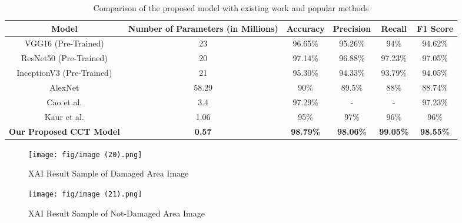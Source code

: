 \documentclass[conference]{IEEEtran}
\begin{document}
\begin{table*}['ht']
\centering
\caption{Comparison of the proposed model with existing work and popular methods}
\label{tab}
\begin{tabular}{|c|c|c|c|c|c|}
\hline
Model                                                         & Number of Parameters  (in Millions) & Accuracy         & Precision        & Recall           & F1 Score         \\ \hline
VGG16 (Pre-Trained)                                           & 23                       & 96.65\%          & 95.26\%          & 94\%             & 94.62\%          \\ \hline
ResNet50 (Pre-Trained)                                        & 20                       & 97.14\%          & 96.88\%          & 97.23\%          & 97.05\%          \\ \hline
InceptionV3 (Pre-Trained)                                     & 21                       & 95.30\%          & 94.33\%          & 93.79\%          & 94.05\%          \\ \hline
AlexNet                                                       & 58.29                    & 90\%             & 89.5\%           & 88\%             & 88.74\%          \\ \hline
Cao et al. \cite{cao_building_2020}        & 3.4                      & 97.29\%          & -                & -                & 97.23\%          \\ \hline
Kaur et al. \cite{kaur_convolutional_2022} & 1.06                     & 95\%             & 97\%             & 96\%             & 96\%             \\ \hline
\textbf{Our Proposed CCT Model}                               & \textbf{0.57}            & \textbf{98.79\%} & \textbf{98.06\%} & \textbf{99.05\%} & \textbf{98.55\%} \\ \hline
\end{tabular}
\end{table*}


\begin{figure}[htbp]
\centerline{\texttt{[image: fig/image (20).png]}}
\caption{XAI Result Sample of Damaged Area Image}
\label{x1_fig}
\end{figure}

\begin{figure}[htbp]
\centerline{\texttt{[image: fig/image (21).png]}}
\caption{XAI Result Sample of Not-Damaged Area Image}
\label{x2_fig}
\end{figure}
\end{document}
